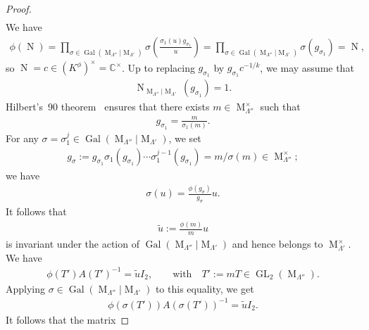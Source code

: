 \documentclass[11pt]{article}
\numberwithin{equation}{section}
\begin{document}
\begin{proof}
\begin{gather*}
\end{gather*}
We have
\begin{gather*}
\phi (\operatorname{N}) = \prod\limits_{\sigma \in
\operatorname{Gal}(\operatorname{M}_{\Lambda''}|\operatorname{M}_{\Lambda'})} \sigma \left(\frac{\sigma_{1}(u)
g_{\sigma_{1}}}{u} \right) = \prod\limits_{\sigma \in
\operatorname{Gal}(\operatorname{M}_{\Lambda''}|\operatorname{M}_{\Lambda'})} \sigma(g_{\sigma_{1}}) = \operatorname{N},
\end{gather*}
so $\operatorname{N}=c \in (K^{\phi})^{\times} = \mathbb C^{\times}$.
Up to replacing $g_{\sigma_1}$ by $g_{\sigma_1}c^{-1/k}$, we may assume that
\begin{gather*}
\operatorname{N}_{\operatorname{M}_{\Lambda''}|\operatorname{M}_{\Lambda'}}(g_{\sigma_1})=1.
\end{gather*}
Hilbert's~90 theorem~\cite[Section~X.1]{Ser} ensures that there exists $m \in \operatorname{M}_{\Lambda''}^{\times}$ such
that
\begin{gather*}
{g_{\sigma_1}=\frac{m}{\sigma_1(m)}}.
\end{gather*}
For any $\sigma=\sigma_{1}^{j} \in \operatorname{Gal}(\operatorname{M}_{\Lambda''}|\operatorname{M}_{\Lambda'})$, we set
\begin{gather*}
g_\sigma:= g_{\sigma_1} \sigma_1 (g_{\sigma_1}) \cdots \sigma_1^{j-1} (g_{\sigma_1})=m/\sigma (m)\in
\operatorname{M}_{\Lambda''}^{\times};
\end{gather*}
we have
\begin{gather*}
\sigma(u)=\frac{\phi (g_{\sigma})}{g_{\sigma}}u.
\end{gather*}
It follows that
\begin{gather*}
\widetilde u:= \frac{\phi (m)}{m} u
\end{gather*}
is invariant under the action of $\operatorname{Gal}(\operatorname{M}_{\Lambda''}|\operatorname{M}_{\Lambda'})$ and
hence belongs to $\operatorname{M}_{\Lambda'}^{\times}$.
We have
\begin{gather*}
\phi\left(T'\right)A\left(T'\right)^{-1}= \widetilde{u} I_{2}, \qquad \text{with} \quad T':=mT \in
\operatorname{GL}_{2}(\operatorname{M}_{\Lambda''}).
\end{gather*}
Applying $\sigma \in \operatorname{Gal}(\operatorname{M}_{\Lambda''}|\operatorname{M}_{\Lambda'})$ to this equality, we
get
\begin{gather*}
\phi\left(\sigma(T')\right)A\left(\sigma(T')\right)^{-1}= \widetilde{u} I_{2}.
\end{gather*}
It follows that the matrix

\end{proof}
\end{document}
